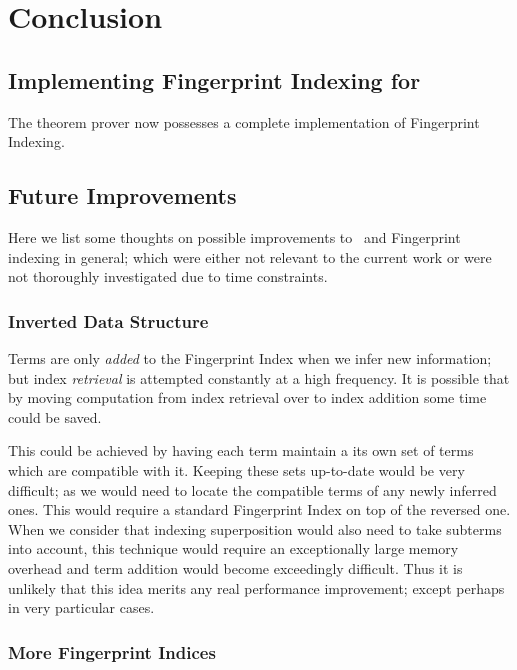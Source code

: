 
\chapter{Conclusion}
\label{cha:conclusion}

\section{Implementing Fingerprint Indexing for \Beagle}

The theorem prover \beagle now possesses a complete implementation of Fingerprint
Indexing. 

\section{Future Improvements}
\label{sec:future}

Here we list some thoughts on possible improvements to \beagle\ and Fingerprint
indexing in general; which were either not relevant to the current work or
were not thoroughly investigated due to time constraints.


\subsection{Inverted Data Structure}
\label{sec:refd}

Terms are only \emph{added} to the Fingerprint Index when we infer new information;
but index \emph{retrieval} is attempted constantly at a high frequency. It is possible
that by moving computation from index retrieval over to index addition some time could
be saved.

This could be achieved by having each term maintain a its own set of terms which
are compatible with it. Keeping these sets up-to-date would be very difficult; as we would
need to locate the compatible terms of any newly inferred ones. This would require a standard
Fingerprint Index on top of the reversed one. When we consider that indexing superposition
would also need to take subterms into account, this technique would require
an exceptionally large memory overhead and term addition would become exceedingly difficult.
Thus it is unlikely that this idea merits any real performance improvement; except
perhaps in very particular cases.

\subsection{More Fingerprint Indices}


